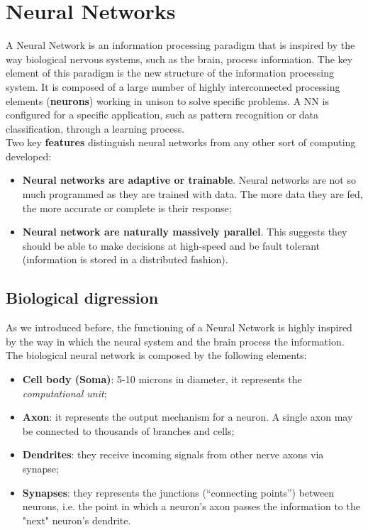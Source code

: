 \section{Neural Networks}

A Neural Network is an information processing paradigm that is inspired by the way biological nervous systems, such as the brain, process information. The key element of this paradigm is the new structure of the information processing system. It is composed of a large number of highly interconnected processing elements (\textbf{neurons}) working in unison to solve specific problems. A NN is configured for a specific application, such as pattern recognition or data classification, through a learning process.\\
Two key \textbf{features} distinguish neural networks from any other sort of computing developed:

\begin{itemize}
	\item \textbf{Neural networks are adaptive or trainable}. Neural networks are not so much programmed as they are trained with data. The more data they are fed, the more accurate or complete is their response;
	\item \textbf{Neural network are naturally massively parallel}. This suggests they should be able to make decisions at high-speed and be fault tolerant (information is stored in a distributed fashion). 
\end{itemize}

\subsection{Biological digression}
As we introduced before, the functioning of a Neural Network is highly inspired by the way in which the neural system and the brain process the information. The biological neural network is composed by the following elements:



\begin{itemize}
	\item \textbf{Cell body (Soma)}: 5-10 microns in diameter, it represents the \textit{computational unit};
	\item \textbf{Axon}: it represents the output mechanism for a neuron. A single axon may be connected to thousands of branches and cells;
	\item \textbf{Dendrites}: they receive incoming signals from other nerve axons via synapse;
	\item \textbf{Synapses}: they represents the junctions (``connecting points'') between neurons, i.e. the point in which a neuron's axon passes the information to the "next" neuron's dendrite.
\end{itemize}

